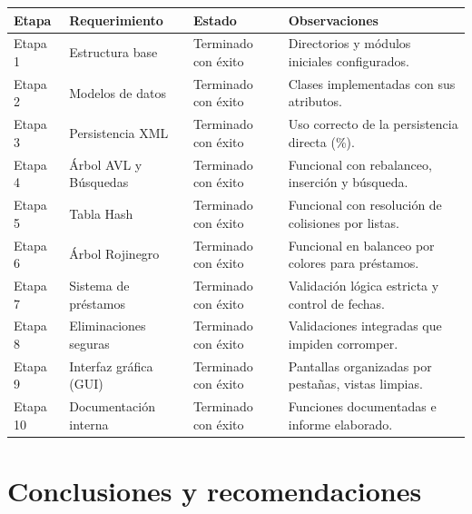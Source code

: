\documentclass[11pt]{article}
\begin{document}
\begin{longtable}{p{} p{} p{} p{}}
\toprule
\textbf{Etapa} & \textbf{Requerimiento} & \textbf{Estado} & \textbf{Observaciones} \\
\midrule
Etapa 1 & Estructura base & Terminado con éxito & Directorios y módulos iniciales configurados. \\
\midrule
Etapa 2 & Modelos de datos & Terminado con éxito & Clases implementadas con sus atributos. \\
\midrule
Etapa 3 & Persistencia XML & Terminado con éxito & Uso correcto de la persistencia directa (\%). \\
\midrule
Etapa 4 & Árbol AVL y Búsquedas & Terminado con éxito & Funcional con rebalanceo, inserción y búsqueda. \\
\midrule
Etapa 5 & Tabla Hash & Terminado con éxito & Funcional con resolución de colisiones por listas. \\
\midrule
Etapa 6 & Árbol Rojinegro & Terminado con éxito & Funcional en balanceo por colores para préstamos. \\
\midrule
Etapa 7 & Sistema de préstamos & Terminado con éxito & Validación lógica estricta y control de fechas. \\
\midrule
Etapa 8 & Eliminaciones seguras & Terminado con éxito & Validaciones integradas que impiden corromper. \\
\midrule
Etapa 9 & Interfaz gráfica (GUI) & Terminado con éxito & Pantallas organizadas por pestañas, vistas limpias. \\
\midrule
Etapa 10 & Documentación interna & Terminado con éxito & Funciones documentadas e informe elaborado. \\
\bottomrule
\end{longtable}

\section{Conclusiones y recomendaciones}
\end{document}
